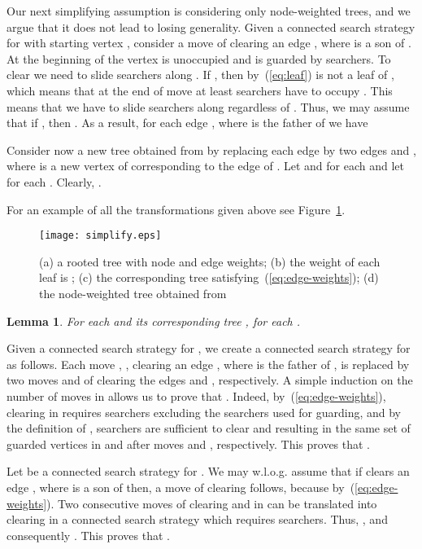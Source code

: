 \documentclass[10pt]{article}
\newenvironment{proof}[1][Proof]
{\par\noindent{\bf #1:} }{\hspace*{\fill}\nolinebreak{}\bigskip\par}
\newtheorem{lemma}{Lemma}
\begin{document}
Our next simplifying assumption is considering only node-weighted trees, and we argue that it does not lead to losing generality. Given a connected search strategy  for  with starting vertex , consider a move  of clearing an edge , where  is a son of . At the beginning of  the vertex  is unoccupied and  is guarded by  searchers. To clear  we need to slide  searchers along . If , then by~(\ref{eq:leaf})  is not a leaf of , which means that at the end of move  at least  searchers have to occupy . This means that we have to slide  searchers along  regardless of . Thus, we may assume that if , then . As a result, for each edge , where  is the father of  we have


Consider now a new tree  obtained from  by replacing each edge  by two edges  and , where  is a new vertex of  corresponding to the edge  of . Let  and  for each  and let  for each . Clearly, .

For an example of all the transformations given above see Figure~\ref{pic:simplify}.
\begin{figure}[htb]
\begin{center}
\texttt{[image: simplify.eps]}
\caption{(a) a rooted tree with node and edge weights;
         (b) the weight of each leaf is ;
         (c) the corresponding tree satisfying~(\ref{eq:edge-weights});
         (d) the node-weighted tree  obtained from }
\label{pic:simplify}
\end{center}
\end{figure}

\begin{lemma} \label{lem:edges_unweighted}
For each  and its corresponding tree ,  for each .
\end{lemma}
\begin{proof}
Given a connected search strategy  for , we create a connected search strategy  for  as follows. Each move , , clearing an edge , where  is the father of , is replaced by two moves  and  of clearing the edges  and , respectively. A simple induction on the number of moves in  allows us to prove that . Indeed, by~(\ref{eq:edge-weights}), clearing  in  requires  searchers excluding the searchers used for guarding, and by the definition of ,  searchers are sufficient to clear  and  resulting in the same set of guarded vertices in  and  after moves  and , respectively. This proves that .

Let  be a connected search strategy for . We may w.l.o.g. assume that if  clears an edge , where  is a son of  then, a move of clearing  follows, because  by~(\ref{eq:edge-weights}). Two consecutive moves of clearing  and  in  can be translated into clearing  in a connected search strategy which requires  searchers. Thus, , and consequently . This proves that .
\end{proof}
\end{document}
